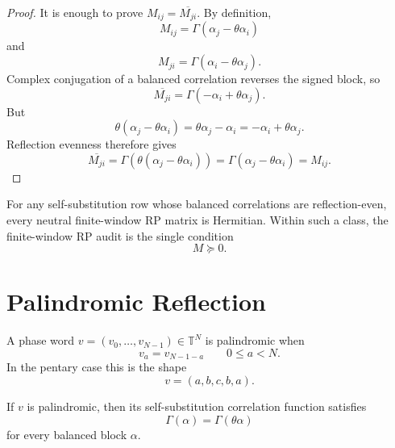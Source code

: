 \begin{proof}
It is enough to prove $M_{ij}=\overline{M_{ji}}$. By definition,
$$
M_{ij}
=
\Gamma(\alpha_j-\theta\alpha_i)
$$
and
$$
M_{ji}
=
\Gamma(\alpha_i-\theta\alpha_j).
$$
Complex conjugation of a balanced correlation reverses the signed block,
so
$$
\overline{M_{ji}}
=
\Gamma(-\alpha_i+\theta\alpha_j).
$$
But
$$
\theta(\alpha_j-\theta\alpha_i)
=
\theta\alpha_j-\alpha_i
=
-\alpha_i+\theta\alpha_j.
$$
Reflection evenness therefore gives
$$
\overline{M_{ji}}
=
\Gamma(\theta(\alpha_j-\theta\alpha_i))
=
\Gamma(\alpha_j-\theta\alpha_i)
=
M_{ij}.
$$
\end{proof}

\begin{corollary}
\label{cor:innovation-input-hermitian-audit-reduction}
For any self-substitution row whose balanced correlations are
reflection-even, every neutral finite-window RP matrix is Hermitian.
Within such a class, the finite-window RP audit is the single condition
$$
M\succeq0.
$$
\end{corollary}

\section{Palindromic Reflection}
\label{sec:innovation-input-palindromic-reflection}

\begin{definition}
\label{def:innovation-input-palindromic-phase-word}
A phase word $v=(v_0,\ldots,v_{N-1})\in\mathbb T^N$ is palindromic when
$$
v_a=v_{N-1-a}
\qquad
0\le a<N.
$$
In the pentary case this is the shape
$$
v=(a,b,c,b,a).
$$
\end{definition}

\begin{theorem}
\label{thm:innovation-input-palindromic-rows-reflection-even}
If $v$ is palindromic, then its self-substitution correlation function
satisfies
$$
\Gamma(\alpha)=\Gamma(\theta\alpha)
$$
for every balanced block $\alpha$.
\end{theorem}

